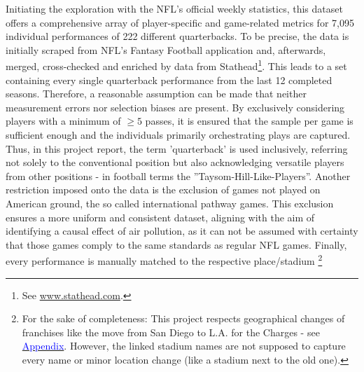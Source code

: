 \documentclass[12pt,a4paper]{article}
\newcommand{\mylink}[2]{\hyperref[#1]{\textcolor{blue}{#2}}}
\begin{document}
Initiating the exploration with the NFL's official weekly statistics, this dataset offers a comprehensive array of player-specific and game-related metrics for 7,095 individual performances of 222 different quarterbacks. To be precise, the data is initially scraped from NFL's Fantasy Football application and, afterwards, merged, cross-checked and enriched by data from Stathead\footnote{See \url{www.stathead.com}.}. This leads to a set containing every single quarterback performance from the last 12 completed seasons. Therefore, a reasonable assumption can be made that neither measurement errors nor selection biases are present. By exclusively considering players with a minimum of $\geq 5$ passes, it is ensured that the sample per game is sufficient enough and the individuals primarily orchestrating plays are captured. Thus, in this project report, the term 'quarterback' is used inclusively, referring not solely to the conventional position but also acknowledging versatile players from other positions - in football terms the ''Taysom-Hill-Like-Players''. Another restriction imposed onto the data is the exclusion of games not played on American ground, the so called  international pathway games. This exclusion ensures a more uniform and consistent dataset, aligning with the aim of identifying a causal effect of air pollution, as it can not be assumed with certainty that those games comply to the same standards as regular NFL games. Finally, every performance is manually matched to the respective place/stadium \footnote{For the sake of completeness: This project respects geographical changes of franchises like the move from San Diego to L.A. for the Charges - see \mylink{AppF:1}{Appendix}. However, the linked stadium names are not supposed to capture every name or minor location change (like a stadium next to the old one).}
\end{document}
